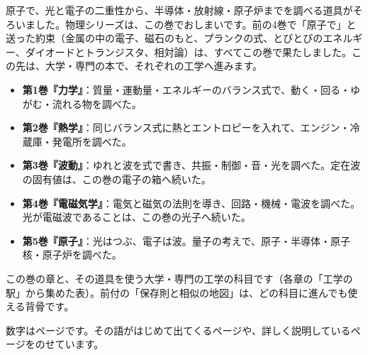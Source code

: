 \newcommand\bknextpill[1]{\bk@pill{#1}}
{\small 原子で、光と電子の二重性から、半導体・放射線・原子炉までを調べる道具がそろいました。物理シリーズは、この巻でおしまいです。前の4巻で「原子で」と送った約束（金属の中の電子、磁石のもと、プランクの式、とびとびのエネルギー、ダイオードとトランジスタ、相対論）は、すべてこの巻で果たしました。この先は、大学・専門の本で、それぞれの工学へ進みます。\par}\vspace{3mm}
\begin{tcolorbox}[enhanced, colframe=phVol5, colback=white, boxrule=0.9pt, arc=2.5mm, left=3mm, right=3mm, top=2mm, bottom=2mm,
  title={物理シリーズ全5巻：数える量と、同じ形の式で読みとく}, fonttitle=\sffamily\bfseries, colbacktitle=phVol5, coltitle=white]
\small
\begin{itemize}[leftmargin=1.2\zw, itemsep=2pt, topsep=1pt, label={\color{phVol5}●}]
\item {\color{phVol1}\textbf{第1巻『力学』}}：質量・運動量・エネルギーのバランス式で、動く・回る・ゆがむ・流れる物を調べた。
\item {\color{phVol2}\textbf{第2巻『熱学』}}：同じバランス式に熱とエントロピーを入れて、エンジン・冷蔵庫・発電所を調べた。
\item {\color{phVol3}\textbf{第3巻『波動』}}：ゆれと波を式で書き、共振・制御・音・光を調べた。定在波の固有値は、この巻の電子の箱へ続いた。
\item {\color{phVol4}\textbf{第4巻『電磁気学』}}：電気と磁気の法則を導き、回路・機械・電波を調べた。光が電磁波であることは、この巻の光子へ続いた。
\item {\color{phVol5}\textbf{第5巻『原子』}}：光はつぶ、電子は波。量子の考えで、原子・半導体・原子核・原子炉を調べた。
\end{itemize}
\end{tcolorbox}
{\small この巻の章と、その道具を使う大学・専門の工学の科目です（各章の「工学の駅」から集めた表）。前付の「保存則と相似の地図」は、どの科目に進んでも使える背骨です。\par}\vspace{2mm}


{\small 数字はページです。その語がはじめて出てくるページや、詳しく説明しているページをのせています。}\par\vspace{2mm}
\raggedcolumns\begin{multicols}{2}\small\setlength{\parskip}{0pt}
\end{multicols}

